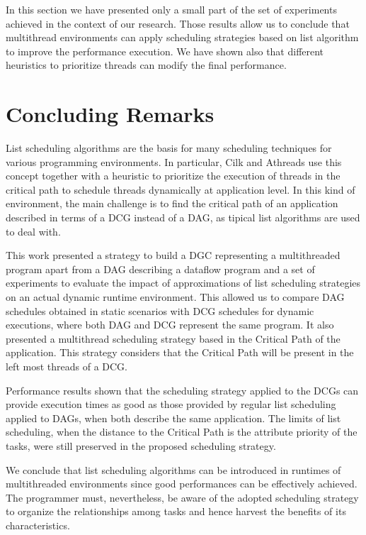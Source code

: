 \documentclass[twocolumn]{svjour3}
\begin{document}
In this section we have presented only a small part of the set of experiments achieved in the context of our research. Those results allow us to conclude that multithread environments can apply scheduling strategies based on list algorithm to improve the performance execution. We have shown also that different heuristics to prioritize threads can modify the final performance.

\section{Concluding Remarks}\label{sec:conclusion}

List scheduling algorithms are the basis for many scheduling techniques for various programming environments. In particular, Cilk and Athreads use this concept together with a heuristic to prioritize the execution of threads in the critical path to schedule threads dynamically at application level. In this kind of environment, the main challenge is to find the critical path of an application described in terms of a DCG instead of a DAG, as tipical list algorithms are used to deal with.

This work presented a strategy to build a DGC representing a multithreaded program apart from a DAG describing a dataflow program and a set of experiments to evaluate the impact of approximations of list scheduling strategies on an actual dynamic runtime environment. This allowed us to compare DAG schedules obtained in static scenarios with DCG schedules for dynamic executions, where both DAG and DCG represent the same program. It also presented a multithread scheduling strategy based in the Critical Path of the application. This strategy considers that the Critical Path will be present in the left most threads of a DCG. 

Performance results shown that the scheduling strategy applied to the DCGs can provide execution times as good as those provided by regular list scheduling applied to DAGs, when both describe the same application. The limits of list scheduling, when the distance to the Critical Path is the attribute priority of the tasks, were still preserved in the proposed scheduling strategy.

We conclude that list scheduling algorithms can be introduced in runtimes of multithreaded environments since good performances can be effectively achieved. The programmer must, nevertheless, be aware of the adopted scheduling strategy to organize the relationships among tasks and hence harvest the benefits of its characteristics.



\end{document}
